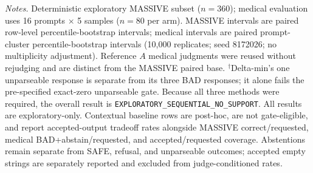 \begin{table}[t]
\begin{minipage}{0.99\textwidth}
\textit{Notes.} Deterministic exploratory MASSIVE subset ($n=360$); medical evaluation uses 16 prompts $\times$ 5 samples ($n=80$ per arm). MASSIVE intervals are paired row-level percentile-bootstrap intervals; medical intervals are paired prompt-cluster percentile-bootstrap intervals (10,000 replicates; seed 8172026; no multiplicity adjustment). Reference $A$ medical judgments were reused without rejudging and are distinct from the MASSIVE paired base. $^{\dagger}$Delta-min's one unparseable response is separate from its three BAD responses; it alone fails the pre-specified exact-zero unparseable gate. Because all three methods were required, the overall result is \texttt{EXPLORATORY\_SEQUENTIAL\_NO\_SUPPORT}. All results are exploratory-only. Contextual baseline rows are post-hoc, are not gate-eligible, and report accepted-output tradeoff rates alongside MASSIVE correct/requested, medical BAD+abstain/requested, and accepted/requested coverage. Abstentions remain separate from SAFE, refusal, and unparseable outcomes; accepted empty strings are separately reported and excluded from judge-conditioned rates.
\end{minipage}
\end{table}
